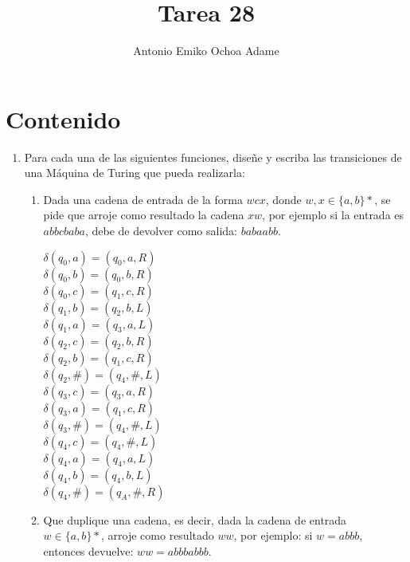 \documentclass{article}
\begin{document}
\title{Tarea 28}
\author{Antonio Emiko Ochoa Adame}
\maketitle

\tableofcontents

\section{Contenido}


\begin{enumerate}
\item Para cada una de las siguientes funciones, diseñe y escriba las
  transiciones de  una Máquina de Turing que pueda realizarla:
  \begin{enumerate}
  \item Dada una cadena de entrada de la forma $wcx$, donde $w, x \in \{a, b\}*$,
    se pide que arroje como resultado la cadena $xw$, por ejemplo si la entrada es
    $abbcbaba$, debe de devolver como salida: $babaabb$.

    $\delta(q_0, a) = (q_0, a, R)$\\
    $\delta(q_0, b) = (q_0, b, R)$\\
    $\delta(q_0, c) = (q_1, c, R)$\\

    $\delta(q_1, b) = (q_2, b, L)$\\
    $\delta(q_1, a) = (q_3, a, L)$\\

    $\delta(q_2, c) = (q_2, b, R)$\\
    $\delta(q_2, b) = (q_1, c, R)$\\
    $\delta(q_2, \#) = (q_4, \#, L)$\\

    $\delta(q_3, c) = (q_3, a, R)$\\
    $\delta(q_3, a) = (q_1, c, R)$\\
    $\delta(q_3, \#) = (q_4, \#, L)$\\

    $\delta(q_4, c) = (q_4, \#, L)$\\
    $\delta(q_4, a) = (q_4, a, L)$\\
    $\delta(q_4, b) = (q_4, b, L)$\\
    $\delta(q_4, \#) = (q_A, \#, R)$\\

  \item Que duplique una cadena, es decir, dada la cadena de entrada $w \in \{a, b\}*$,
    arroje como resultado $ww$, por ejemplo: si $w = abbb$, entonces devuelve: $ww = abbbabbb$.


\end{enumerate}
\end{enumerate}
\end{document}
